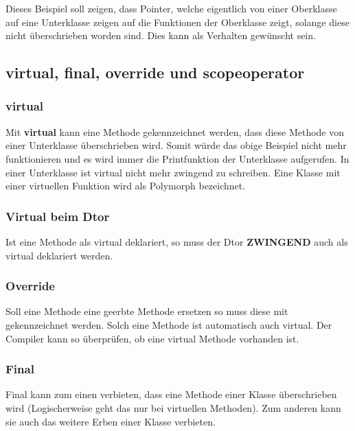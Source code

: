

Dieses Beispiel soll zeigen, dass Pointer, welche eigentlich von einer Oberklasse auf eine Unterklasse zeigen auf die  Funktionen der Oberklasse zeigt, solange diese nicht überschrieben worden sind.
Dies kann als Verhalten gewünscht sein. 

\subsection{virtual, final, override und scopeoperator}

\subsubsection{virtual}\label{Virtual}

Mit \textbf{virtual} kann eine Methode gekennzeichnet werden, dass diese Methode von einer Unterklasse überschrieben wird.
Somit würde das obige Beispiel nicht mehr funktionieren und es wird immer die Printfunktion der Unterklasse aufgerufen. 
In einer Unterklasse ist virtual nicht mehr zwingend zu schreiben.
Eine Klasse mit einer virtuellen Funktion wird als Polymorph bezeichnet.

\subsubsection{Virtual beim Dtor}

Ist eine Methode als virtual deklariert, so muss der Dtor \textbf{ZWINGEND} auch als virtual deklariert werden.

\subsubsection{Override}

Soll eine Methode eine geerbte Methode ersetzen so muss diese mit  gekennzeichnet werden. 
Solch eine Methode ist automatisch auch virtual.
Der Compiler kann so überprüfen, ob eine virtual Methode vorhanden ist.

\subsubsection{Final}

Final kann zum einen verbieten, dass eine Methode einer Klasse überschrieben wird
(Logischerweise geht das nur bei virtuellen Methoden). 
Zum anderen kann sie auch das weitere Erben einer Klasse verbieten. 

